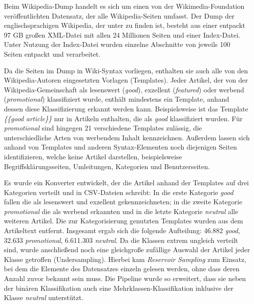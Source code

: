 Beim Wikipedia-Dump handelt es sich um einen von der Wikimedia-Foundation veröffentlichten Datensatz, der alle Wikipedia-Seiten umfasst. Der Dump der englischsprachigen Wikipedia, der unter \cite{WpDump2024} zu finden ist, besteht aus einer entpackt 97 GB großen XML-Datei mit allen 24 Millionen Seiten und einer Index-Datei. Unter Nutzung der Index-Datei wurden einzelne Abschnitte von jeweils 100 Seiten entpackt und verarbeitet.

Da die Seiten im Dump in Wiki-Syntax vorliegen, enthalten sie auch alle von den Wikipedia-Autoren eingesetzten Vorlagen (Templates). Jeder Artikel, der von der Wiki\-pedia-Gemeinschaft als lesenswert (\emph{good}), exzellent (\emph{featured}) oder werbend (\emph{promotional}) klassifiziert wurde, enthält mindestens ein Template, anhand dessen diese Klassifizierung erkannt werden kann.
Beispielsweise ist das Template \textit{\{\{good article\}\}} nur in Artikeln enthalten, die als \emph{good} klassifiziert wurden. Für \emph{promotional} sind hingegen 21 verschiedene Templates zulässig, die unterschiedliche Arten von werbendem Inhalt kennzeichnen. Außerdem lassen sich anhand von Templates und anderen Syntax-Elementen noch diejenigen Seiten identifizieren, welche keine Artikel darstellen, beispielsweise Begriffsklärungsseiten, Umleitungen, Kategorien und Benutzerseiten.

Es wurde ein Konverter entwickelt, der die Artikel anhand der Templates auf drei Kategorien verteilt und in CSV-Dateien schreibt: In die erste Kategorie \emph{good} fallen die als lesenswert und exzellent gekennzeichneten; in die zweite Kategorie \emph{promotional} die als werbend erkannten und in die letzte Kategorie \emph{neutral} alle weiteren Artikel. Die zur Kategorisierung genutzten Templates wurden aus dem Artikeltext entfernt. Insgesamt ergab sich die folgende Aufteilung: 46.882 \emph{good}, 32.633 \emph{promotional}, 6.611.303 \emph{neutral}. Da die Klassen extrem ungleich verteilt sind, wurde anschließend noch eine gleichgroße zufällige Auswahl der Artikel jeder Klasse getroffen (Undersampling). Hierbei kam \textit{Reservoir Sampling} \cite{Vitter1985} zum Einsatz, bei dem die Elemente des Datensatzes einzeln gelesen werden, ohne dass deren Anzahl zuvor bekannt sein muss. Die Pipeline wurde so erweitert, dass sie neben der binären Klassifikation auch eine Mehrklassen-Klassifikation inklusive der Klasse \emph{neutral} unterstützt.

